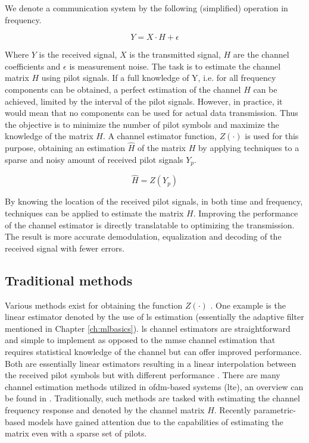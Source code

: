 We denote a communication system by the following (simplified) operation in frequency.


\begin{equation}
    Y = X \cdot H + \epsilon
\end{equation}

Where $Y$ is the received signal, $X$ is the transmitted signal, $H$ are the channel coefficients and $\epsilon$ is measurement noise. The task is to estimate the channel matrix $H$ using pilot signals. If a full knowledge of Y, i.e. for all frequency components can be obtained, a perfect estimation of the channel $H$ can be achieved, limited by the interval of the pilot signals. However, in practice, it would mean that no components can be used for actual data transmission. Thus the objective is to minimize the number of pilot symbols and maximize the knowledge of the matrix $H$. A channel estimator function, $Z(\cdot)$ is used for this purpose, obtaining an estimation $\hat{H}$ of the matrix $H$ by applying techniques to a sparse and noisy amount of received pilot signals $Y_p$. 

\begin{equation}
    \hat{H} = Z(Y_p)
\end{equation}

By knowing the location of the received pilot signals, in both time and frequency, techniques can be applied to estimate the matrix $H$. Improving the performance of the channel estimator is directly translatable to optimizing the transmission. The result is more accurate demodulation, equalization and decoding of the received signal with fewer errors.



\subsection{Traditional methods}

Various methods exist for obtaining the function $Z(\cdot)$ \cite{Oyerinde2012ReviewSystems}. One example is the linear estimator denoted by the use of \gls{ls} estimation (essentially the adaptive filter mentioned in Chapter \ref{ch:mlbasics}). \acrlong{ls} channel estimators are straightforward and simple to implement as opposed to the \gls{mmse} channel estimation that requires statistical knowledge of the channel but can offer improved performance. Both are essentially linear estimators resulting in a linear interpolation between the received pilot symbols but with different performance \cite{Cho2010MIMO-OFDMMATLAB}. There are many channel estimation methods utilized in \gls{ofdm}-based systems (\gls{lte}), an overview can be found in \cite{Liu2014ChannelOFDM}. Traditionally, such methods are tasked with estimating the channel frequency response and denoted by the channel matrix $H$. Recently parametric-based models have gained attention due to the capabilities of estimating the matrix even with a sparse set of pilots.


